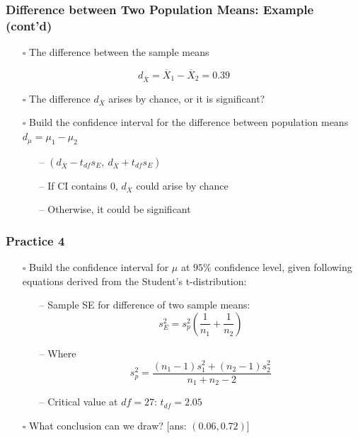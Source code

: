\documentclass[handout]{beamer}
\begin{document}
\begin{frame}
    \frametitle{Difference between Two Population Means: Example (cont'd)}
    \begin{itemize}[wide = 0pt]
        \item[$\square$] The difference between the sample means
    \end{itemize}
    \begin{equation*}
        d_{\overline{X}}=\overline{X}_1 - \overline{X}_2=0.39
    \end{equation*}
    \begin{itemize}[wide = 0pt]
        \item[$\square$] The difference $d_{\overline{X}}$ arises by chance, or it is significant?
        \item[$\square$] Build the confidence interval for the difference between population means $d_{\mu}=\mu_1 - \mu_2$
        \begin{itemize}
            \item[--] $(d_{\overline{X}}-t_{df}s_E,\ d_{\overline{X}}+t_{df}s_E)$
            \item[--] If CI contains 0, $d_{\overline{X}}$ could arise by chance
            \item[--] Otherwise, it could be significant
        \end{itemize}
    \end{itemize}
    \vspace*{\fill}
\end{frame}

\begin{frame}
    \frametitle{Practice 4}
    \begin{itemize}[wide = 0pt]
        \item[$\square$] Build the confidence interval for $\mu$ at $95\%$ confidence level, given following equations derived from the Student's t-distribution:
        \begin{itemize}
            \item[--] Sample SE for difference of two sample means:
            \begin{equation*}
                s_E^2 = s_p^2(\frac{1}{n_1}+\frac{1}{n_2})
            \end{equation*}
            \item[--] Where
            \begin{equation*}
                s_p^2=\frac{(n_1-1)s_1^2+(n_2-1)s_2^2}{n_1+n_2-2}
            \end{equation*}
            \item[--] Critical value at $df=27$: $t_{df}=2.05$
        \end{itemize}
        \item[$\square$] What conclusion can we draw? [ans: $(0.06, 0.72)$]
    \end{itemize}
    \vspace*{\fill}
\end{frame}
\end{document}
